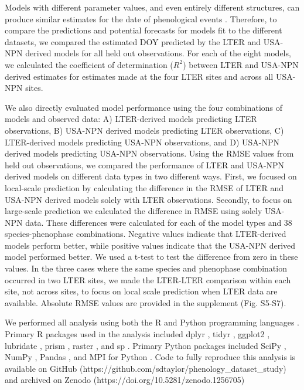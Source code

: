 \documentclass[fleqn,12pt,lineno]{article}
\begin{document}
Models with different parameter values, and even entirely different structures, can produce similar estimates for the date of phenological events \citep{basler2016}. Therefore, to compare the predictions and potential forecasts for models fit to the different datasets, we compared the estimated DOY predicted by the LTER and USA-NPN derived models for all held out observations. For each of the eight models, we calculated the coefficient of determination ($R^2$) between LTER and USA-NPN derived estimates for estimates made at the four LTER sites and across all USA-NPN sites.  

We also directly evaluated model performance using the four combinations of models and observed data: A) LTER-derived models predicting LTER observations, B) USA-NPN derived models predicting LTER observations, C) LTER-derived models predicting USA-NPN observations, and D) USA-NPN derived models predicting USA-NPN observations. Using the RMSE values from held out observations, we  compared the  performance of LTER and USA-NPN derived models on different data types in two different ways. First, we focused on local-scale prediction by calculating the difference in the RMSE of LTER and USA-NPN derived models solely with LTER observations. Secondly, to focus on large-scale prediction we calculated the difference in RMSE using solely USA-NPN data. These differences were calculated for each of the model types and 38 species-phenophase combinations. Negative values indicate that LTER-derived models perform better, while positive values indicate that the USA-NPN derived model performed better. We used a t-test to test the difference from zero in these values. In the three cases where the same species and phenophase combination occurred in two LTER sites, we made the LTER-LTER comparison within each site, not across sites, to focus on local scale prediction when LTER data are available. Absolute RMSE values are provided in the supplement (Fig. S5-S7).

We performed all analysis using both the R and Python programming languages \citep{rcitation, python}. Primary R packages used in the analysis included dplyr \citep{dplyr}, tidyr \citep{tidyr}, ggplot2 \citep{ggplot2}, lubridate \citep{lubridate}, prism \citep{prismR}, raster \citep{rasterR}, and sp \citep{sp1}. Primary Python packages included SciPy \citep{scipy}, NumPy \citep{numpy}, Pandas \citep{pandas}, and MPI for Python \citep{mpi4py}. Code to fully reproduce this analysis is available on GitHub  (https://github.com/sdtaylor/phenology\_dataset\_study) and archived on Zenodo  (https://doi.org/10.5281/zenodo.1256705)
\end{document}
